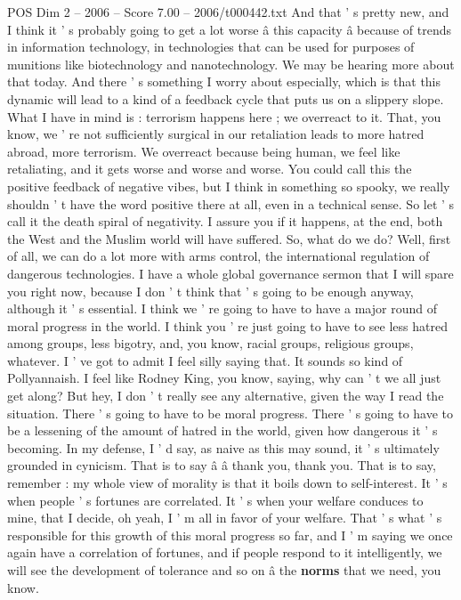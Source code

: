 \begin{textsample}{POS Dim 2 – 2006 – Score 7.00 – 2006/t000442.txt}
And that ' s pretty new, and I think it ' s probably going to get a lot worse â this capacity â because of trends in information technology, in technologies that can be used for purposes of munitions like biotechnology and nanotechnology.
We may be hearing more about that today.
And there ' s something I worry about especially, which is that this dynamic will lead to a kind of a feedback cycle that puts us on a slippery slope.
What I have in mind is : terrorism happens here ; we overreact to it.
That, you know, we ' re not sufficiently surgical in our retaliation leads to more hatred abroad, more terrorism.
We overreact because being human, we feel like retaliating, and it gets worse and worse and worse.
You could call this the positive feedback of negative vibes, but I think in something so spooky, we really shouldn ' t have the word positive there at all, even in a technical sense.
So let ' s call it the death spiral of negativity.
I assure you if it happens, at the end, both the West and the Muslim world will have suffered.
So, what do we do?
Well, first of all, we can do a lot more with arms control, the international regulation of dangerous technologies.
I have a whole global governance sermon that I will spare you right now, because I don ' t think that ' s going to be enough anyway, although it ' s essential.
I think we ' re going to have to have a major round of moral progress in the world.
I think you ' re just going to have to see less hatred among groups, less bigotry, and, you know, racial groups, religious groups, whatever.
I ' ve got to admit I feel silly saying that.
It sounds so kind of Pollyannaish.
I feel like Rodney King, you know, saying, why can ' t we all just get along?
But hey, I don ' t really see any alternative, given the way I read the situation.
There ' s going to have to be moral progress.
There ' s going to have to be a lessening of the amount of hatred in the world, given how dangerous it ' s becoming.
In my defense, I ' d say, as naive as this may sound, it ' s ultimately grounded in cynicism.
That is to say â â thank you, thank you.
That is to say, remember : my whole view of morality is that it boils down to self-interest.
It ' s when people ' s fortunes are correlated.
It ' s when your welfare conduces to mine, that I decide, oh yeah, I ' m all in favor of your welfare.
That ' s what ' s responsible for this growth of this moral progress so far, and I ' m saying we once again have a correlation of fortunes, and if people respond to it intelligently, we will see the development of tolerance and so on â the \textbf{norms} that we need, you know.

\end{textsample}
